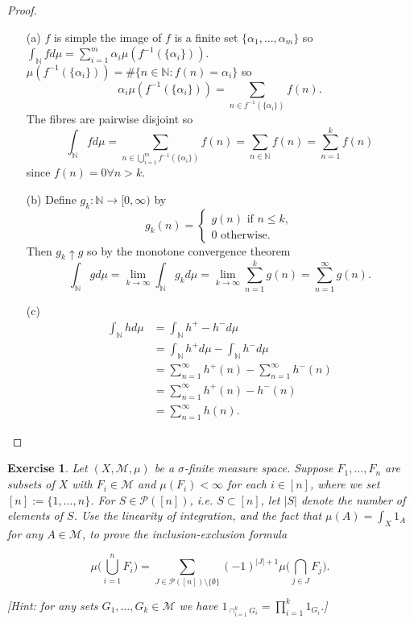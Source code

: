 \documentclass{article}
\newtheorem{exercise}[theorem]{Exercise}
\begin{document}
\begin{proof}
\begin{enumerate}
    \item[(a)] $f$ is simple the image of $f$ is a finite set $\{\alpha_1,...,\alpha_m\}$ so $\int_{\mathbb{N}}fd\mu=\sum_{i=1}^m\alpha_i\mu(f^{-1}(\{\alpha_i\}))$. $\mu(f^{-1}(\{\alpha_i\}))=\#\{n\in\mathbb{N}:f(n)=\alpha_i\}$ so \[\alpha_i\mu(f^{-1}(\{\alpha_i\}))=\sum_{n\in f^{-1}(\{\alpha_i\})}f(n).\] The fibres are pairwise disjoint so \[\int_{\mathbb{N}}fd\mu=\sum_{n\in\bigcup_{i=1}^mf^{-1}(\{\alpha_i\})}f(n)=\sum_{n\in\mathbb{N}}f(n)=\sum_{n=1}^kf(n)\] since $f(n)=0\forall n>k$.
    \item[(b)] Define $g_k:\mathbb{N}\to[0,\infty)$ by \[g_k(n)=\begin{cases}
        g(n)\text{ if }n\leq k,\\
        0\text{ otherwise.}
    \end{cases}\] Then $g_k\uparrow g$ so by the monotone convergence theorem \[\int_{\mathbb{N}}gd\mu=\lim_{k\to\infty}\int_{\mathbb{N}}g_kd\mu=\lim_{k\to\infty}\sum_{n=1}^kg(n)=\sum_{n=1}^\infty g(n).\]
    \item[(c)] \begin{align*}\int_{\mathbb{N}}hd\mu&=\int_{\mathbb{N}}h^+-h^-d\mu\\&=\int_{\mathbb{N}}h^+d\mu-\int_{\mathbb{N}}h^-d\mu\\&=\sum_{n=1}^\infty h^+(n)-\sum_{n=1}^\infty h^-(n)\\&=\sum_{n=1}^\infty h^+(n)-h^-(n)\\&=\sum_{n=1}^\infty h(n).\end{align*}
\end{enumerate}
\end{proof}
\begin{exercise}
Let \( (X, \mathcal{M}, \mu) \) be a \(\sigma\)-finite measure space. Suppose \( F_1, \dots, F_n \) are subsets of \( X \) with \( F_i \in \mathcal{M} \) and \( \mu(F_i) < \infty \) for each \( i \in [n] \), where we set \( [n] := \{1, \dots, n\} \). For \( S \in \mathcal{P}([n]) \), i.e. \( S \subset [n] \), let \( |S| \) denote the number of elements of \( S \). Use the linearity of integration, and the fact that \( \mu(A) = \int_X 1_A \) for any \( A \in \mathcal{M} \), to prove the \textit{inclusion-exclusion formula}
    
    \[
    \mu\Big(\bigcup_{i=1}^{n} F_i\Big) = \sum_{J \in \mathcal{P}([n]) \setminus \{\emptyset\}} (-1)^{|J|+1} \mu\Big(\bigcap_{j \in J} F_j\Big).
    \]
    
    [\textit{Hint: for any sets \( G_1, \dots, G_k \in \mathcal{M} \) we have \( 1_{\cap_{i=1}^{k} G_i} = \prod_{i=1}^{k} 1_{G_i} \).}]
\end{exercise}  
\end{document}
